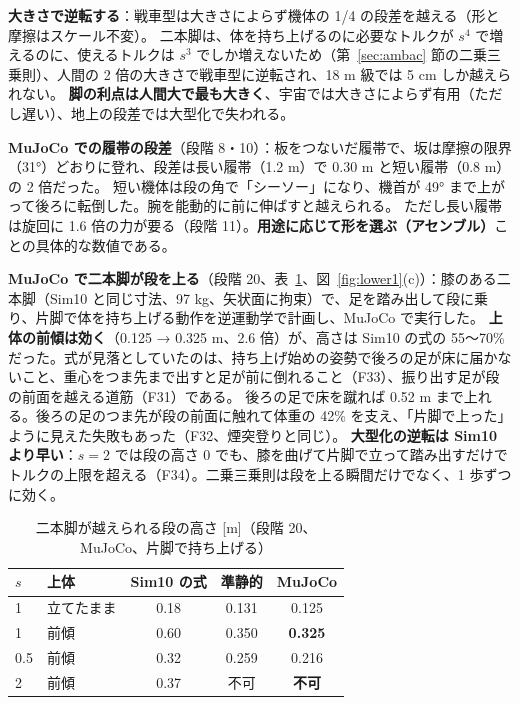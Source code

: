 \documentclass[paper=a4paper,fontsize=10pt,twocolumn,column_gap=2zw,line_length=24zw,number_of_lines=46,head_space=20mm]{jlreq}
\begin{document}
\textbf{大きさで逆転する}：戦車型は大きさによらず機体の 1/4 の段差を越える（形と摩擦はスケール不変）。
二本脚は、体を持ち上げるのに必要なトルクが $s^4$ で増えるのに、使えるトルクは $s^3$ でしか増えないため（第~\ref{sec:ambac} 節の二乗三乗則）、人間の 2 倍の大きさで戦車型に逆転され、18 m 級では 5 cm しか越えられない。
\textbf{脚の利点は人間大で最も大きく}、宇宙では大きさによらず有用（ただし遅い）、地上の段差では大型化で失われる。

\textbf{MuJoCo での履帯の段差}（段階 8・10）：板をつないだ履帯で、坂は摩擦の限界（31°）どおりに登れ、段差は長い履帯（1.2 m）で 0.30 m と短い履帯（0.8 m）の 2 倍だった。
短い機体は段の角で「シーソー」になり、機首が 49° まで上がって後ろに転倒した。腕を能動的に前に伸ばすと越えられる。
ただし長い履帯は旋回に 1.6 倍の力が要る（段階 11）。\textbf{用途に応じて形を選ぶ（アセンブル）}ことの具体的な数値である。

\textbf{MuJoCo で二本脚が段を上る}（段階 20、表~\ref{tab:steps20}、図~\ref{fig:lower1}(c)）：膝のある二本脚（Sim10 と同じ寸法、97 kg、矢状面に拘束）で、足を踏み出して段に乗り、片脚で体を持ち上げる動作を逆運動学で計画し、MuJoCo で実行した。
\textbf{上体の前傾は効く}（0.125 → 0.325 m、2.6 倍）が、高さは Sim10 の式の 55〜70\% だった。式が見落としていたのは、持ち上げ始めの姿勢で後ろの足が床に届かないこと、重心をつま先まで出すと足が前に倒れること（F33）、振り出す足が段の前面を越える道筋（F31）である。
後ろの足で床を蹴れば 0.52 m まで上れる。後ろの足のつま先が段の前面に触れて体重の 42\% を支え、「片脚で上った」ように見えた失敗もあった（F32、煙突登りと同じ）。
\textbf{大型化の逆転は Sim10 より早い}：$s=2$ では段の高さ 0 でも、膝を曲げて片脚で立って踏み出すだけでトルクの上限を超える（F34）。二乗三乗則は段を上る瞬間だけでなく、1 歩ずつに効く。

\begin{table}[t]\centering\small
\caption{二本脚が越えられる段の高さ [m]（段階 20、MuJoCo、片脚で持ち上げる）}\label{tab:steps20}
\setlength{\tabcolsep}{3pt}
\begin{tabular}{llccc}\toprule
$s$ & 上体 & Sim10 の式 & 準静的 & \textbf{MuJoCo} \\\midrule
1 & 立てたまま & 0.18 & 0.131 & 0.125 \\
1 & 前傾 & 0.60 & 0.350 & \textbf{0.325} \\
0.5 & 前傾 & 0.32 & 0.259 & 0.216 \\
2 & 前傾 & 0.37 & 不可 & \textbf{不可} \\\bottomrule
\end{tabular}
\end{table}
\end{document}
